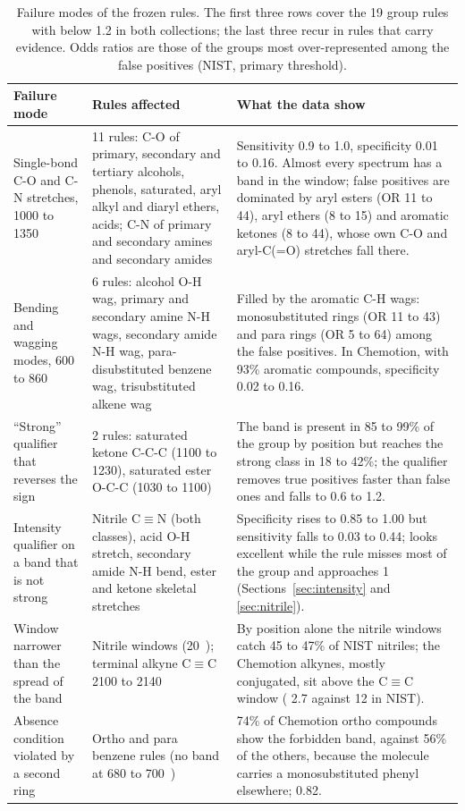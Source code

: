 \begin{table}[t]
\centering\small
\caption{Failure modes of the frozen rules. The first three rows cover the 19 group rules with \LRp{} below 1.2 in both collections; the last three recur in rules that carry evidence. Odds ratios are those of the groups most over-represented among the false positives (NIST, primary threshold).}
\label{tab:failures}
\begin{tabular}{@{}p{3.6cm}p{4.6cm}p{6.6cm}@{}}
\toprule
Failure mode & Rules affected & What the data show \\
\midrule
Single-bond C-O and C-N stretches, 1000 to 1350~\wn{} & 11 rules: C-O of primary, secondary and tertiary alcohols, phenols, saturated, aryl alkyl and diaryl ethers, acids; C-N of primary and secondary amines and secondary amides & Sensitivity 0.9 to 1.0, specificity 0.01 to 0.16. Almost every spectrum has a band in the window; false positives are dominated by aryl esters (OR 11 to 44), aryl ethers (8 to 15) and aromatic ketones (8 to 44), whose own C-O and aryl-C(=O) stretches fall there. \\
Bending and wagging modes, 600 to 860~\wn{} & 6 rules: alcohol O-H wag, primary and secondary amine N-H wags, secondary amide N-H wag, para-disubstituted benzene wag, trisubstituted alkene wag & Filled by the aromatic C-H wags: monosubstituted rings (OR 11 to 43) and para rings (OR 5 to 64) among the false positives. In Chemotion, with 93\% aromatic compounds, specificity 0.02 to 0.16. \\
``Strong'' qualifier that reverses the sign & 2 rules: saturated ketone C-C-C (1100 to 1230), saturated ester O-C-C (1030 to 1100) & The band is present in 85 to 99\% of the group by position but reaches the strong class in 18 to 42\%; the qualifier removes true positives faster than false ones and \LRp{} falls to 0.6 to 1.2. \\
\midrule
Intensity qualifier on a band that is not strong & Nitrile C$\equiv$N (both classes), acid O-H stretch, secondary amide N-H bend, ester and ketone skeletal stretches & Specificity rises to 0.85 to 1.00 but sensitivity falls to 0.03 to 0.44; \LRp{} looks excellent while the rule misses most of the group and \LRn{} approaches 1 (Sections~\ref{sec:intensity} and \ref{sec:nitrile}). \\
Window narrower than the spread of the band & Nitrile windows (20~\wn{}); terminal alkyne C$\equiv$C 2100 to 2140 & By position alone the nitrile windows catch 45 to 47\% of NIST nitriles; the Chemotion alkynes, mostly conjugated, sit above the C$\equiv$C window (\LRp{} 2.7 against 12 in NIST). \\
Absence condition violated by a second ring & Ortho and para benzene rules (no band at 680 to 700~\wn{}) & 74\% of Chemotion ortho compounds show the forbidden band, against 56\% of the others, because the molecule carries a monosubstituted phenyl elsewhere; \LRp{} 0.82. \\
\bottomrule
\end{tabular}
\end{table}


